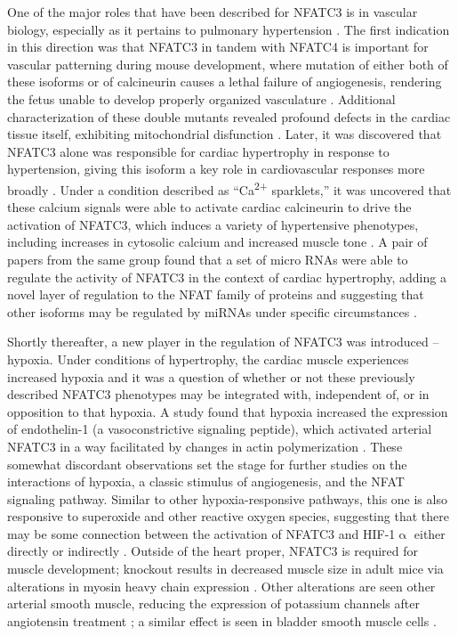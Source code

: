 One of the major roles that have been described for NFATC3 is in vascular biology, especially as it pertains to pulmonary hypertension \citep{NievesCintron2007, NievesCintron2008}. The first indication in this direction was that NFATC3 in tandem with NFATC4 is important for vascular patterning during mouse development, where mutation of either both of these isoforms or of calcineurin causes a lethal failure of angiogenesis, rendering the fetus unable to develop properly organized vasculature \citep{Graef2001}. Additional characterization of these double mutants revealed profound defects in the cardiac tissue itself, exhibiting mitochondrial disfunction \citep{Kegley2001, Bushdid2003}. Later, it was discovered that NFATC3 alone was responsible for cardiac hypertrophy in response to hypertension, giving this isoform a key role in cardiovascular responses more broadly \citep{Wilkins2002}. Under a condition described as ``Ca\textsuperscript{2+} sparklets,'' it was uncovered that these calcium signals were able to activate cardiac calcineurin to drive the activation of NFATC3, which induces a variety of hypertensive phenotypes, including increases in cytosolic calcium and increased muscle tone \citep{NievesCintron2007}. A pair of papers from the same group found that a set of micro RNAs were able to regulate the activity of NFATC3 in the context of cardiac hypertrophy, adding a novel layer of regulation to the NFAT family of proteins and suggesting that other isoforms may be regulated by miRNAs under specific circumstances \citep{Lin2009, Wang2010}. 

Shortly thereafter, a new player in the regulation of NFATC3 was introduced -- hypoxia. Under conditions of hypertrophy, the cardiac muscle experiences increased hypoxia and it was a question of whether or not these previously described NFATC3 phenotypes may be integrated with, independent of, or in opposition to that hypoxia. A study found that hypoxia increased the expression of endothelin\hyp{}1 (a vasoconstrictive signaling peptide), which activated arterial NFATC3 in a way facilitated by changes in actin polymerization \citep{deFrutos2011}. These somewhat discordant observations set the stage for further studies on the interactions of hypoxia, a classic stimulus of angiogenesis, and the NFAT signaling pathway. Similar to other hypoxia\hyp{}responsive pathways, this one is also responsive to superoxide and other reactive oxygen species, suggesting that there may be some connection between the activation of NFATC3 and HIF\hyp{}1$\upalpha$ either directly or indirectly \citep{RamiroDiaz2014}. Outside of the heart proper, NFATC3 is required for muscle development; knockout results in decreased muscle size in adult mice via alterations in myosin heavy chain expression \citep{Kegley2001, Delling2000}. Other alterations are seen other arterial smooth muscle, reducing the expression of potassium channels after angiotensin treatment \citep{Stevenson2001, Amberg2004}; a similar effect is seen in bladder smooth muscle cells \citep{Layne2008}. 

